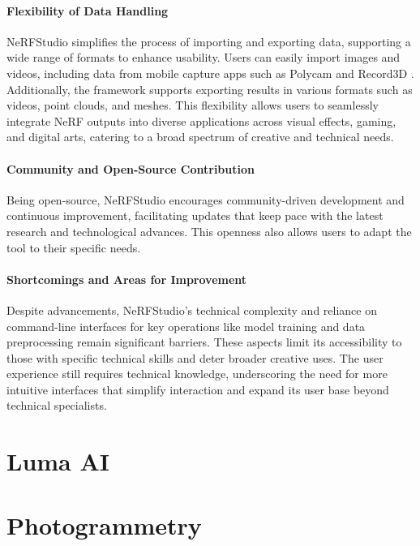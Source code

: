 \paragraph{Flexibility of Data Handling}
NeRFStudio simplifies the process of importing and exporting data, supporting a wide range of formats to enhance usability. Users can easily import images and videos, including data from mobile capture apps such as Polycam \cite{noauthor_polycam_nodate} and Record3D \cite{noauthor_record3d_nodate}. Additionally, the framework supports exporting results in various formats such as videos, point clouds, and meshes. This flexibility allows users to seamlessly integrate NeRF outputs into diverse applications across visual effects, gaming, and digital arts, catering to a broad spectrum of creative and technical needs.

\paragraph{Community and Open-Source Contribution}
Being open-source, NeRFStudio encourages community-driven development and continuous improvement, facilitating updates that keep pace with the latest research and technological advances. This openness also allows users to adapt the tool to their specific needs.

\paragraph{Shortcomings and Areas for Improvement}

Despite advancements, NeRFStudio's technical complexity and reliance on command-line interfaces for key operations like model training and data preprocessing remain significant barriers. These aspects limit its accessibility to those with specific technical skills and deter broader creative uses. The user experience still requires technical knowledge, underscoring the need for more intuitive interfaces that simplify interaction and expand its user base beyond technical specialists.

\section{Luma AI}
\label{sec:related:lmua}

\section{Photogrammetry}
\label{sec:related:photogrammetry}
